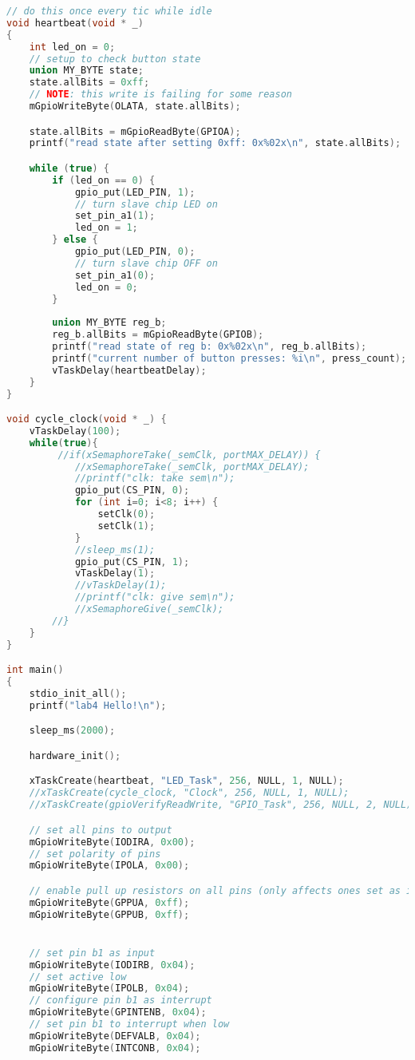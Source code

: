 \documentclass[sigconf]{article}
\begin{document}
\begin{lstlisting}[basicstyle=\footnotesize\ttfamily, language=c,breaklines]
// do this once every tic while idle
void heartbeat(void * _)
{   
    int led_on = 0;
    // setup to check button state
    union MY_BYTE state;
    state.allBits = 0xff;
    // NOTE: this write is failing for some reason
    mGpioWriteByte(OLATA, state.allBits);

    state.allBits = mGpioReadByte(GPIOA);
    printf("read state after setting 0xff: 0x%02x\n", state.allBits);

    while (true) {
        if (led_on == 0) {
            gpio_put(LED_PIN, 1);
            // turn slave chip LED on
            set_pin_a1(1);
            led_on = 1;
        } else {
            gpio_put(LED_PIN, 0);
            // turn slave chip OFF on
            set_pin_a1(0);
            led_on = 0;
        }
        
        union MY_BYTE reg_b;
        reg_b.allBits = mGpioReadByte(GPIOB);
        printf("read state of reg b: 0x%02x\n", reg_b.allBits);
        printf("current number of button presses: %i\n", press_count);
        vTaskDelay(heartbeatDelay);
    }
}

void cycle_clock(void * _) {
    vTaskDelay(100);
    while(true){
         //if(xSemaphoreTake(_semClk, portMAX_DELAY)) {
            //xSemaphoreTake(_semClk, portMAX_DELAY);
            //printf("clk: take sem\n");
            gpio_put(CS_PIN, 0);
            for (int i=0; i<8; i++) {
                setClk(0);
                setClk(1);
            }
            //sleep_ms(1);
            gpio_put(CS_PIN, 1);
            vTaskDelay(1);
            //vTaskDelay(1);
            //printf("clk: give sem\n");
            //xSemaphoreGive(_semClk);
        //}
    }
}

int main()
{
    stdio_init_all();
    printf("lab4 Hello!\n");

    sleep_ms(2000);

    hardware_init();

    xTaskCreate(heartbeat, "LED_Task", 256, NULL, 1, NULL);
    //xTaskCreate(cycle_clock, "Clock", 256, NULL, 1, NULL);
    //xTaskCreate(gpioVerifyReadWrite, "GPIO_Task", 256, NULL, 2, NULL);

    // set all pins to output
    mGpioWriteByte(IODIRA, 0x00);
    // set polarity of pins
    mGpioWriteByte(IPOLA, 0x00);

    // enable pull up resistors on all pins (only affects ones set as inputs)
    mGpioWriteByte(GPPUA, 0xff);
    mGpioWriteByte(GPPUB, 0xff);


    // set pin b1 as input
    mGpioWriteByte(IODIRB, 0x04);
    // set active low
    mGpioWriteByte(IPOLB, 0x04);
    // configure pin b1 as interrupt
    mGpioWriteByte(GPINTENB, 0x04);
    // set pin b1 to interrupt when low
    mGpioWriteByte(DEFVALB, 0x04);
    mGpioWriteByte(INTCONB, 0x04);


\end{lstlisting}
\end{document}
